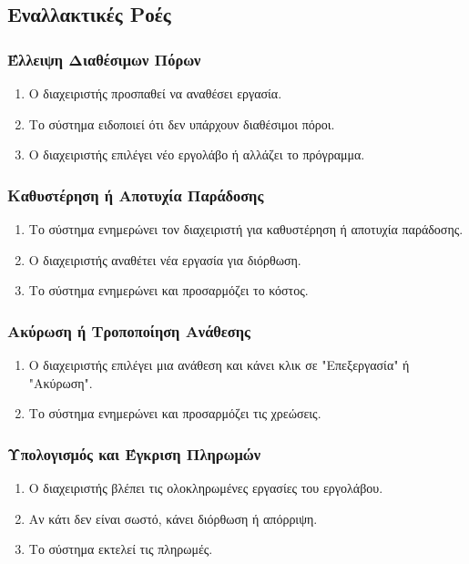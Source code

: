 \documentclass{article}
\begin{document}
\subsection{Εναλλακτικές Ροές}

\subsubsection{Έλλειψη Διαθέσιμων Πόρων}
\begin{enumerate}
	\item Ο διαχειριστής προσπαθεί να αναθέσει εργασία.
	\item Το σύστημα ειδοποιεί ότι δεν υπάρχουν διαθέσιμοι πόροι.
	\item Ο διαχειριστής επιλέγει νέο εργολάβο ή αλλάζει το πρόγραμμα.
\end{enumerate}

\subsubsection{Καθυστέρηση ή Αποτυχία Παράδοσης}
\begin{enumerate}
	\item Το σύστημα ενημερώνει τον διαχειριστή για καθυστέρηση ή αποτυχία παράδοσης.
	\item Ο διαχειριστής αναθέτει νέα εργασία για διόρθωση.
	\item Το σύστημα ενημερώνει και προσαρμόζει το κόστος.
\end{enumerate}

\subsubsection{Ακύρωση ή Τροποποίηση Ανάθεσης}
\begin{enumerate}
	\item Ο διαχειριστής επιλέγει μια ανάθεση και κάνει κλικ σε "Επεξεργασία" ή "Ακύρωση".
	\item Το σύστημα ενημερώνει και προσαρμόζει τις χρεώσεις.
\end{enumerate}

\subsubsection{Υπολογισμός και Έγκριση Πληρωμών}
\begin{enumerate}
	\item Ο διαχειριστής βλέπει τις ολοκληρωμένες εργασίες του εργολάβου.
	\item Αν κάτι δεν είναι σωστό, κάνει διόρθωση ή απόρριψη.
	\item Το σύστημα εκτελεί τις πληρωμές.
\end{enumerate}
\end{document}
